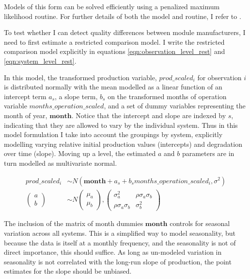 \documentclass[12pt]{article}
\begin{document}
Models of this form can be solved efficiently using a penalized maximum likelihood routine. For further details of both the model and routine, I refer to \citet{bates_fitting_2015}.

To test whether I can detect quality differences between module manufacturers, I need to first estimate a restricted comparison model. I write the restricted comparison model explicitly in equations \ref{eqn:observation_level_rest} and \ref{eqn:system_level_rest}.

In this model, the transformed production variable, $prod\_scaled_{i}$ for observation $i$ is distributed normally with the mean modelled as a linear function of an intercept term $a_s$, a slope term, $b_s$ on the transformed months of operation variable $months\_operation\_scaled$, and a set of dummy variables representing the month of year, $\mathbf{month}$. Notice that the intercept and slope are indexed by $s$, indicating that they are allowed to vary by the individual system. Thus in this model formulation I take into account the groupings by system, explicitly modelling varying relative initial production values (intercepts) and degradation over time (slope). Moving up a level, the estimated $a$ and $b$ parameters are in turn modelled as multivariate normal.

\begin{align}
prod\_scaled_{i} &\sim N(\mathbf{month} + a_s + b_s months\_operation\_scaled_{i}, \sigma^2)\\
\label{eqn:observation_level_rest}
\begin{pmatrix}
  a\\
  b
\end{pmatrix}
&\sim N
\begin{pmatrix}
  \mu_a\\
  \mu_b
\end{pmatrix},
\begin{pmatrix}
  \sigma_a^2 & \rho \sigma_a \sigma_b \\
  \rho \sigma_a \sigma_b & \sigma_b^2
\end{pmatrix}
\label{eqn:system_level_rest}
\end{align}

The inclusion of the matrix of month dummies $\mathbf{month}$ controls for seasonal variation across all systems. This is a simplified way to model seasonality, but because the data is itself at a monthly frequency, and the seasonality is not of direct importance, this should suffice. As long as un-modeled variation in seasonality is not correlated with the long-run slope of production, the point estimates for the slope should be unbiased.
\end{document}
